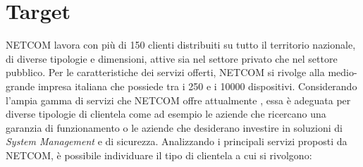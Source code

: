 \section{Target}
NETCOM lavora con più di 150 clienti distribuiti su tutto il territorio nazionale, di diverse tipologie e dimensioni, attive sia nel settore privato che nel settore pubblico. 
Per le caratteristiche dei servizi offerti, NETCOM si rivolge alla medio-grande impresa italiana che possiede tra i 250 e i 10000 dispositivi. Considerando l'ampia gamma di servizi che NETCOM offre attualmente , essa è adeguata per diverse tipologie di clientela come ad esempio le aziende che ricercano una garanzia di funzionamento o le aziende che desiderano investire in soluzioni di \emph{System Management} e di sicurezza. 
Analizzando i principali servizi proposti da NETCOM, è possibile individuare il tipo di clientela a cui si rivolgono:
